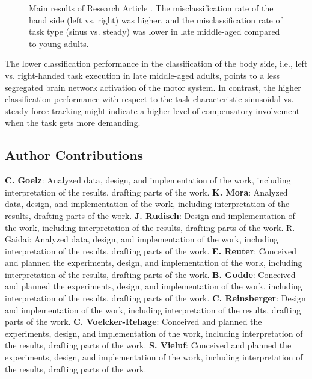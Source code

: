 \begin{figure}[h]
\begin{center}

\caption[Main results of Research Article .]{Main results of Research Article . The misclassification rate of the hand side (left vs. right)  was higher, and the misclassification rate of task type (sinus vs. steady) was lower in late middle-aged compared to young adults.}
\label{fig:results1}
\end{center}
\end{figure}

\noindent The lower classification performance in the classification of the body side, i.e., left vs. right-handed task execution in late middle-aged adults, points to a less segregated brain network activation of the motor system. In contrast, the higher classification performance with respect to the task characteristic sinusoidal vs. steady force tracking might indicate a higher level of compensatory involvement when the task gets more demanding.

\subsection*{Author Contributions}
\textbf{C. Goelz}: Analyzed data, design, and implementation of the work, including interpretation of the results, drafting parts of the work. \textbf{K. Mora}: Analyzed data, design, and implementation of the work, including interpretation of the results, drafting parts of the work. \textbf{J. Rudisch}: Design and implementation of the work, including interpretation of the results, drafting parts of the work. R. Gaidai: Analyzed data, design, and implementation of the work, including interpretation of the results, drafting parts of the work. \textbf{E. Reuter}: Conceived and planned the experiments, design, and implementation of the work, including interpretation of the results, drafting parts of the work. \textbf{B. Godde}: Conceived and planned the experiments, design, and implementation of the work, including interpretation of the results, drafting parts of the work. \textbf{C. Reinsberger}: Design and implementation of the work, including interpretation of the results, drafting parts of the work. \textbf{C. Voelcker-Rehage}: Conceived and planned the experiments, design, and implementation of the work, including interpretation of the results, drafting parts of the work. \textbf{S. Vieluf}: Conceived and planned the experiments, design, and implementation of the work, including interpretation of the results, drafting parts of the work.
